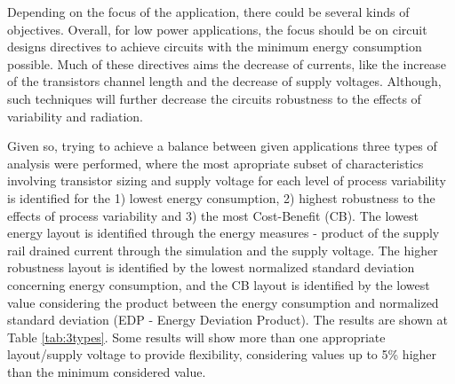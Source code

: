 \documentclass[pgmicro,diss,english]{iiufrgs}
\begin{document}





	Depending on the focus of the application, there could be several kinds of objectives. Overall, for low power applications, the focus should be on circuit designs directives to achieve circuits with the minimum energy consumption possible. Much of these directives aims the decrease of currents, like the increase of the transistors channel length and the decrease of supply voltages. Although, such techniques will further decrease the circuits robustness to the effects of variability and radiation.

Given so, trying to achieve a balance between given applications three types of analysis were performed, where the most apropriate subset of characteristics involving transistor sizing and supply voltage for each level of process variability is identified for the 1) lowest energy consumption, 2) highest robustness to the effects of process variability and 3) the most Cost-Benefit (CB). The lowest energy layout is identified through the energy measures - product of the supply rail drained current through the simulation and the supply voltage. The higher robustness layout is identified by the lowest normalized standard deviation concerning energy consumption, and the CB layout is identified by the lowest value considering the product between the energy consumption and normalized standard deviation (EDP - Energy Deviation Product). The results are shown at Table \ref{tab:3types}. Some results will show more than one appropriate layout/supply voltage to provide flexibility, considering values up to 5\% higher than the minimum considered value.
\end{document}
